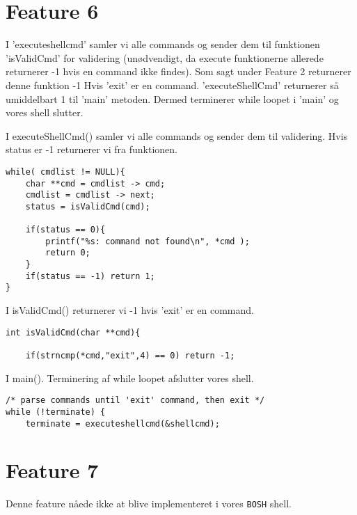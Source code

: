 \documentclass[danish]{report}
\begin{document}
\section{Feature 6}


I 'executeshellcmd' samler vi alle commands og sender dem til funktionen 'isValidCmd' for validering (unødvendigt, da execute funktionerne allerede returnerer -1 hvis en command ikke findes). Som sagt under Feature 2 returnerer denne funktion -1 Hvis 'exit' er en command. 'executeShellCmd' returnerer så umiddelbart 1 til 'main' metoden. Dermed terminerer while loopet i 'main' og vores shell slutter. 

I executeShellCmd() samler vi alle commands og sender dem til validering. Hvis status er -1 returnerer vi fra funktionen.

\begin{lstlisting}
while( cmdlist != NULL){
	char **cmd = cmdlist -> cmd;
	cmdlist = cmdlist -> next;
	status = isValidCmd(cmd);

	if(status == 0){ 
		printf("%s: command not found\n", *cmd );
		return 0;
	}
	if(status == -1) return 1;
}
\end{lstlisting}

I isValidCmd() returnerer vi -1 hvis 'exit' er en command.
\begin{lstlisting}
int isValidCmd(char **cmd){
	
	if(strncmp(*cmd,"exit",4) == 0) return -1;
\end{lstlisting}

I main(). Terminering af while loopet afslutter vores shell. 
\begin{lstlisting}
/* parse commands until 'exit' command, then exit */
while (!terminate) {
	terminate = executeshellcmd(&shellcmd);
\end{lstlisting}

\section{Feature 7}

Denne feature nåede ikke at blive implementeret i vores {\tt BOSH} shell.
\end{document}
